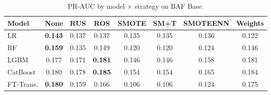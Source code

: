 \begin{table}[H]
\centering
\caption{PR-AUC by model $\times$ strategy on BAF Base.}
\label{tab:factorial_baf_prauc}
\begin{tabular}{l c c c c c c c}
\toprule
Model & None & RUS & ROS & SMOTE & SM+T & SMOTEENN & Weights \\
\midrule
LR         & \textbf{0.143} & 0.137 & 0.137 & 0.135 & 0.135 & 0.136 & 0.122 \\
RF         & \textbf{0.159} & 0.135 & 0.149 & 0.120 & 0.120 & 0.124 & 0.146 \\
LGBM       & 0.177 & 0.171 & \textbf{0.181} & 0.146 & 0.146 & 0.158 & 0.181 \\
CatBoost   & 0.180 & 0.178 & \textbf{0.185} & 0.154 & 0.154 & 0.165 & 0.184 \\
FT-Trans.  & \textbf{0.180} & 0.159 & 0.166 & 0.106 & 0.106 & 0.124 & 0.175 \\
\bottomrule
\end{tabular}
\end{table}